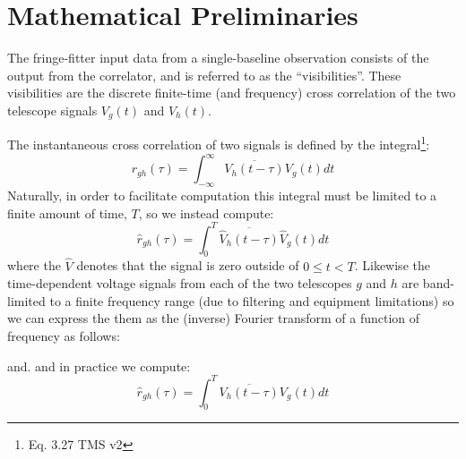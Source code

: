 \section{Mathematical Preliminaries}

The fringe-fitter input data from a single-baseline observation consists of the output from the correlator, 
and is referred to as the ``visibilities''. These visibilities are the discrete finite-time (and frequency) cross correlation of the two telescope signals $V_g(t)$ and $ V_h(t)$.

The instantaneous cross correlation of two signals is defined by the integral\footnote{Eq. 3.27 TMS v2}:
\begin{equation}
 r_{gh}(\tau) = \int_{-\infty}^{\infty} \overline{V_h(t-\tau)} V_g(t) dt
\end{equation}
Naturally, in order to facilitate computation this integral must be limited to a finite amount of time, $T$, so we
instead compute:
\begin{equation}
 \hat{r}_{gh}(\tau) = \int_{0}^{T} \overline{ \hat{V}_h(t-\tau)} \hat{V}_g(t) dt
\end{equation}
where the $\hat{V}$ denotes that the signal is zero outside of $0 \leq t < T$. Likewise the time-dependent voltage signals from each of the two telescopes $g$ and $h$ are band-limited
to a finite frequency range (due to filtering and equipment limitations) so we can express the them as the (inverse) Fourier transform of a function of frequency as follows:


and. 
and in practice we
compute:
\begin{equation}
  \hat{r}_{gh}(\tau) = \int_{0}^{T} \overline{V_h(t-\tau)} V_g(t) dt
\end{equation}




